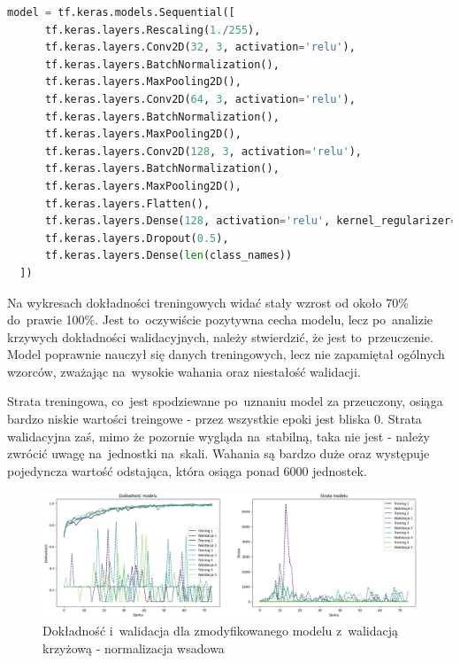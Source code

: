 \begin{lstlisting}[language=Python,caption=Listing zmodyfikowanego skryptu tworzącego model z~walidacją krzyżową - wersja 2,
	label={tests-model-crossval2}]
	model = tf.keras.models.Sequential([
      tf.keras.layers.Rescaling(1./255),
      tf.keras.layers.Conv2D(32, 3, activation='relu'),
      tf.keras.layers.BatchNormalization(),
      tf.keras.layers.MaxPooling2D(),
      tf.keras.layers.Conv2D(64, 3, activation='relu'),
      tf.keras.layers.BatchNormalization(),
      tf.keras.layers.MaxPooling2D(),
      tf.keras.layers.Conv2D(128, 3, activation='relu'),
      tf.keras.layers.BatchNormalization(),
      tf.keras.layers.MaxPooling2D(),
      tf.keras.layers.Flatten(),
      tf.keras.layers.Dense(128, activation='relu', kernel_regularizer=tf.keras.regularizers.l2(0.01)),
      tf.keras.layers.Dropout(0.5),
      tf.keras.layers.Dense(len(class_names))
  ])
\end{lstlisting}

Na wykresach dokładności treningowych widać stały wzrost od około 70\% do~prawie 100\%.
Jest to~oczywiście pozytywna cecha modelu, lecz po~analizie krzywych dokładności walidacyjnych,
należy stwierdzić, że jest to~przeuczenie. Model poprawnie nauczył się danych treningowych,
lecz nie zapamiętał ogólnych wzorców, zważając na~wysokie wahania oraz niestałość walidacji.

Strata treningowa, co~jest spodziewane po~uznaniu model za przeuczony,
osiąga bardzo niskie wartości treingowe - przez wszystkie epoki jest bliska 0.
Strata walidacyjna zaś, mimo że pozornie wygląda na~stabilną, taka nie jest
- należy zwrócić uwagę na~jednostki na~skali. Wahania są bardzo duże oraz występuje pojedyncza wartość odstająca,
która osiąga ponad 6000 jednostek.

\begin{figure}[ht]
	\centering
	\includegraphics[width=15.5cm]{resources/tests/images/v4/crossvalid_2_img.png}
	\caption{Dokładność i~walidacja dla zmodyfikowanego modelu z~walidacją krzyżową - normalizacja wsadowa}
	\label{Fig:tests-cv-2a}
\end{figure}
\FloatBarrier

